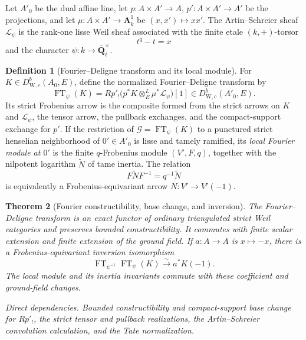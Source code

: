 \documentclass[10pt]{article}
\newtheorem{theorem}{Theorem}[section]
\theoremstyle{definition}
\newtheorem{definition}[theorem]{Definition}
\newcommand{\Qlb}{\overline{\mathbf Q}_\ell}
\newcommand{\DW}{D^b_{\mathrm W,c}}
\newcommand{\dep}[1]{\par\smallskip\noindent\textit{Direct dependencies.} #1\par}
\begin{document}
Let \(A'_0\) be the dual affine line, let
\(p:A\times A'\to A\), \(p':A\times A'\to A'\) be the projections, and let
\(\mu:A\times A'\to\mathbf A^1_{\bar k}\) be \((x,x')\mapsto xx'\).
The Artin--Schreier sheaf \(\mathcal L_\psi\) is the rank-one lisse Weil
sheaf associated with the finite etale \((k,+)\)-torsor
\[
                              t^q-t=x
\]
and the character \(\psi:k\to\Qlb^\times\).

\begin{definition}[Fourier--Deligne transform and its local module]
For \(K\in\DW(A_0,E)\), define the normalized Fourier--Deligne transform
by
\[
 \operatorname{FT}_\psi(K)
   =Rp'_!\bigl(p^*K\otimes_E^L\mu^*\mathcal L_\psi\bigr)[1]
   \in\DW(A'_0,E).
\]
Its strict Frobenius arrow is the composite formed from the strict arrows on
\(K\) and \(\mathcal L_\psi\), the tensor arrow, the pullback exchanges,
and the compact-support exchange for \(p'\).  If the restriction of
\(\mathcal G=\operatorname{FT}_\psi(K)\) to a punctured strict henselian
neighborhood of \(0'\in A'_0\) is lisse and tamely ramified, its
\emph{local Fourier module at \(0'\)} is the finite \(q\)-Frobenius module
\((V',F,q)\), together with the nilpotent logarithm \(\widetilde N\) of
tame inertia.  The relation
\[
                  F\widetilde NF^{-1}=q^{-1}\widetilde N
\]
is equivalently a Frobenius-equivariant arrow \(N:V'\to V'(-1)\).
\end{definition}

\begin{theorem}[Fourier constructibility, base change, and inversion]
The Fourier--Deligne transform is an exact functor of ordinary triangulated
strict Weil categories and preserves bounded constructibility.  It commutes
with finite scalar extension and finite extension of the ground field.  If
\(a:A\to A\) is \(x\mapsto-x\), there is a Frobenius-equivariant inversion
isomorphism
\[
       \operatorname{FT}_{\psi^{-1}}\operatorname{FT}_\psi(K)
                  \xrightarrow{\sim}a^*K(-1).
\]
The local module and its inertia invariants commute with these coefficient
and ground-field changes.
\dep{Bounded constructibility and compact-support base change for \(Rp'_!\),
the strict tensor and pullback realizations, the Artin--Schreier convolution
calculation, and the Tate normalization.}
\end{theorem}
\end{document}
